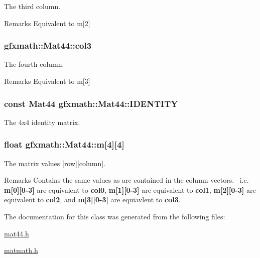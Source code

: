 The third column. 

\begin{DoxyRemark}{Remarks}
Equivalent to m\mbox{[}2\mbox{]} 
\end{DoxyRemark}
\hypertarget{classgfxmath_1_1_mat44_a09c1b1363d41cee3b241cf8843d02289}{}
\subsubsection[{col3}]{ gfxmath\+::\+Mat44\+::col3}\label{classgfxmath_1_1_mat44_a09c1b1363d41cee3b241cf8843d02289}


The fourth column. 

\begin{DoxyRemark}{Remarks}
Equivalent to m\mbox{[}3\mbox{]} 
\end{DoxyRemark}
\hypertarget{classgfxmath_1_1_mat44_acf3201b485f8e67fd931703fb2c55ead}{}
\subsubsection[{I\+D\+E\+N\+T\+I\+T\+Y}]{\setlength{\rightskip}{0pt plus 5cm}const {\bf Mat44} gfxmath\+::\+Mat44\+::\+I\+D\+E\+N\+T\+I\+T\+Y\hspace{0.3cm}{\ttfamily [static]}}\label{classgfxmath_1_1_mat44_acf3201b485f8e67fd931703fb2c55ead}


The 4x4 identity matrix. 

\hypertarget{classgfxmath_1_1_mat44_a59a6195e1c74aee94b3434b9fed8aa7a}{}
\subsubsection[{m}]{\setlength{\rightskip}{0pt plus 5cm}float gfxmath\+::\+Mat44\+::m\mbox{[}4\mbox{]}\mbox{[}4\mbox{]}}\label{classgfxmath_1_1_mat44_a59a6195e1c74aee94b3434b9fed8aa7a}


The matrix values \mbox{[}row\mbox{]}\mbox{[}column\mbox{]}. 

\begin{DoxyRemark}{Remarks}
Contains the same values as are contained in the column vectors.~\newline
 i.\+e. {\bfseries m\mbox{[}0\mbox{]}\mbox{[}0-\/3\mbox{]}} are equivalent to {\bfseries col0}, {\bfseries m\mbox{[}1\mbox{]}\mbox{[}0-\/3\mbox{]}} are equivalent to {\bfseries col1}, {\bfseries m\mbox{[}2\mbox{]}\mbox{[}0-\/3\mbox{]}} are equivalent to {\bfseries col2}, and {\bfseries m\mbox{[}3\mbox{]}\mbox{[}0-\/3\mbox{]}} are equiavlent to {\bfseries col3}. 
\end{DoxyRemark}


The documentation for this class was generated from the following files\+:\begin{DoxyCompactItemize}
\item 
\hyperlink{mat44_8h}{mat44.\+h}\item 
\hyperlink{matmath_8h}{matmath.\+h}\end{DoxyCompactItemize}

